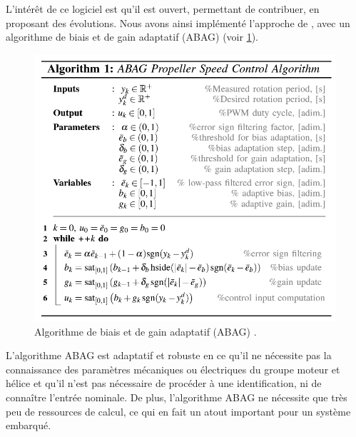 L'intérêt de ce logiciel est qu'il est ouvert, permettant de contribuer, en proposant des évolutions. Nous avons ainsi implémenté l'approche de \cite{franchi2017}, avec un algorithme de biais et de gain adaptatif (ABAG) (voir \ref{fig:ABAG_algo}).

\begin{figure}[ht!]
    \centerline{
    \includegraphics[trim=0cm 0cm 0cm 0cm,clip,width=0.6\columnwidth]{figures/ABAG_algo.png}}
    \caption{Algorithme de biais et de gain adaptatif (ABAG) \cite{franchi2017}.}
    \label{fig:ABAG_algo}
\end{figure}
L'algorithme ABAG est adaptatif et robuste en ce qu'il ne nécessite pas la connaissance des paramètres mécaniques ou électriques du groupe moteur et hélice et qu'il n'est pas nécessaire de procéder à une identification, ni de connaître l'entrée nominale. De plus, l'algorithme ABAG ne nécessite que très peu de ressources de calcul, ce qui en fait un atout important pour un système embarqué.

\renewcommand{\thefigure}{\thechapter.\arabic{figure}}
\renewcommand{\thetable}{\thechapter.\arabic{table}}